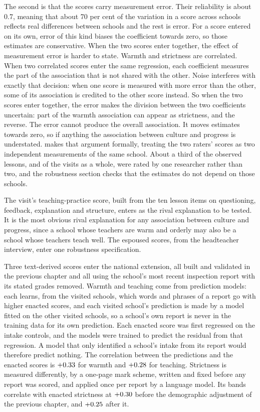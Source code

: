 The second is that the scores carry measurement error. Their reliability
is about 0.7, meaning that about 70 per cent of the variation in a score
across schools reflects real differences between schools and the rest is
error. For a score entered on its own, error of this kind biases the coefficient towards zero, so those estimates are conservative. When the two scores enter together, the effect of measurement error is harder to state.
 Warmth and strictness are correlated. When two correlated scores enter the same regression, each coefficient measures the part of the association that is not shared with the other. Noise interferes with exactly that decision: when one score is measured with more error than the other, some of its association is credited to the other score instead. So when the two scores enter together, the error makes the division between the two coefficients uncertain: part of the warmth association can appear as strictness, and the reverse. The error cannot produce the overall association. It moves estimates towards zero, so if anything the association between culture and progress is understated.  makes that argument formally, treating the two raters' scores as two independent measurements of the same school. About a third
of the observed lessons, and \DaysOneRater{} of the \NTierOne{} visits as a
whole, were rated by one researcher rather than two, and the
robustness section checks that the estimates do not depend on those schools.

The visit's teaching-practice score, built from the ten lesson items on questioning, feedback, explanation and structure, enters as the rival explanation to be tested. It
is the most obvious rival explanation for any association between culture
and progress, since a school whose teachers are warm and orderly may also be
a school whose teachers teach well. The espoused scores, from the headteacher
interview, enter one robustness specification.

Three text-derived scores
enter the national extension, all built and validated in the previous
chapter and all using the school's most recent inspection report with its stated grades removed. Warmth and teaching come from prediction
models: each learns, from the visited schools, which words and phrases of
a report go with higher enacted scores, and each visited school's prediction is made by a model fitted on the other visited schools, so a school's own report is never in the training data for its own prediction. Each enacted score was first regressed on the intake controls, and the models were trained to predict the residual from that regression. A model that only identified a school's intake from its report would therefore predict nothing. The correlation between the predictions and the enacted scores is $+0.33$ for warmth and
$+0.28$ for teaching. Strictness is measured differently, by a one-page mark scheme, written and fixed before any report was scored, and applied once per report by a language model. Its bands correlate with
enacted strictness at $+0.30$ before the demographic adjustment
of the previous chapter, and $+0.25$ after it.

